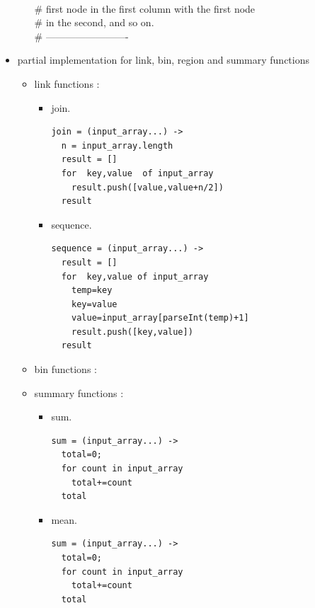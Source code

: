 \documentclass[12pt]{article}
\begin{document}
\begin{itemize}
\begin{itemize}
\\
\# \hspace{70}first\hspace{2} node \hspace{2}in\hspace{2} the\hspace{2} first \hspace{2} column \hspace{2}with \hspace{2}the \hspace{2}first \hspace{2}node 
\\
\#   \hspace{70}in\hspace{2} the\hspace{2} second,\hspace{2} and\hspace{2} so\hspace{2} on.
\\
\# -------------------------
\\
\end{itemize}
\item partial implementation for link, bin, region and summary functions
\begin{itemize}
\item link functions :

\begin{itemize}
\item join.
\begin{lstlisting}[frame=single] 
join = (input_array...) ->
  n = input_array.length
  result = []
  for  key,value  of input_array
    result.push([value,value+n/2])
  result
\end{lstlisting}
\item sequence. 
\begin{lstlisting}[frame=single] 
sequence = (input_array...) ->
  result = []
  for  key,value of input_array
    temp=key
    key=value
    value=input_array[parseInt(temp)+1]
    result.push([key,value])
  result
\end{lstlisting} 
\end{itemize}
\item bin functions :
\item summary functions :
\begin{itemize}
\item sum.
\begin{lstlisting}[frame=single]
sum = (input_array...) ->
  total=0;
  for count in input_array
    total+=count
  total
\end{lstlisting} 
\item mean.
\begin{lstlisting}[frame=single]
sum = (input_array...) ->
  total=0;
  for count in input_array
    total+=count
  total



\end{lstlisting}
\end{itemize}
\end{itemize}
\end{itemize}
\end{document}
